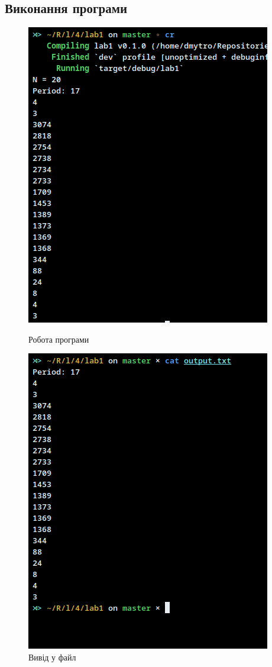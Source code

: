 \documentclass[oneside,14pt]{extarticle}
\begin{document}
\begin{normalsize}
	\subsection*{Виконання програми}
	\begin{figure}[H]
		\centering
		\begin{minipage}{0.45\textwidth}
			\centering
			\includegraphics[scale=0.8]{1}
			\caption{Робота програми}
		\end{minipage}
		\hfill
		\begin{minipage}{0.45\textwidth}
			\centering
			\includegraphics[scale=0.8]{2}
			\caption{Вивід у файл}
		\end{minipage}
	\end{figure}
	

\end{normalsize}
\end{document}
